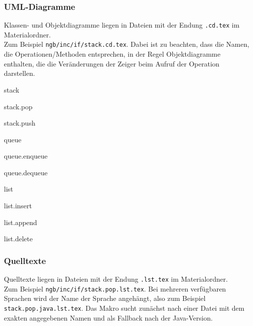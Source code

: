 \subsubsection{UML-Diagramme}
Klassen- und Objektdiagramme liegen in Dateien mit der Endung \texttt{.cd.tex} im Materialordner. \\Zum Beispiel \texttt{ngb/inc/if/stack.cd.tex}. Dabei ist zu beachten, dass die Namen, die Operationen/Methoden entsprechen, in 
der Regel Objektdiagramme enthalten, die die Veränderungen der Zeiger beim Aufruf der Operation darstellen.

\begin{multicols}{2}\ttfamily
	\begin{smallitemize}
		\item stack
		\item stack.pop
		\item stack.push
		\item queue
		\item queue.enqueue
		\item queue.dequeue
		\item list
		\item list.insert
		\item list.append
		\item list.delete
	\end{smallitemize}
\end{multicols}

\subsubsection{Quelltexte}
Quelltexte liegen in Dateien mit der Endung \texttt{.lst.tex} im Materialordner. \\Zum Beispiel \texttt{ngb/inc/if/stack.pop.lst.tex}.
Bei mehreren verfügbaren Sprachen wird der Name der Sprache angehängt, also zum Beispiel \texttt{stack.pop.java.lst.tex}. Das Makro
sucht zunächst nach einer Datei mit dem exakten angegebenen Namen und als Fallback nach der Java-Version.

